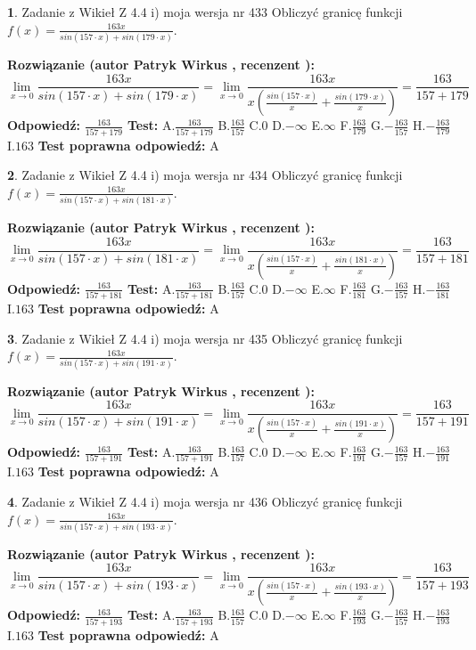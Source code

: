 \documentclass[12pt, a4paper]{article}
\theoremstyle{definition} %
\newtheorem{zad}{}
\newcommand{\zadStart}[1]{\begin{zad}#1\newline}
\newcommand{\zadStop}{\end{zad}}
\newcommand{\rozwStart}[2]{\noindent \textbf{Rozwiązanie (autor #1 , recenzent #2): }\newline}
\newcommand{\rozwStop}{\newline}
\newcommand{\odpStart}{\noindent \textbf{Odpowiedź:}\newline}
\newcommand{\odpStop}{\newline}
\newcommand{\testStart}{\noindent \textbf{Test:}\newline}
\newcommand{\testStop}{\newline}
\newcommand{\kluczStart}{\noindent \textbf{Test poprawna odpowiedź:}\newline}
\newcommand{\kluczStop}{\newline}
\begin{document}
\zadStart{Zadanie z Wikieł Z 4.4 i) moja wersja nr 433}
Obliczyć granicę funkcji $f(x)=\frac{163x}{sin(157\cdot x) +sin(179\cdot x)}$.
\zadStop
\rozwStart{Patryk Wirkus}{}
$$\lim\limits_{x\to 0}\frac{163x}{sin(157\cdot x) +sin(179\cdot x)}=\lim\limits_{x\to 0}\frac{163x}{x(\frac{sin(157\cdot x)}{x}+\frac{sin(179\cdot x)}{x})}=\frac{163}{157+179}$$
\rozwStop
\odpStart
$\frac{163}{157+179}$
\odpStop
\testStart
A.$\frac{163}{157+179}$
B.$\frac{163}{157}$
C.$0$
D.$-\infty$
E.$\infty$
F.$\frac{163}{179}$
G.$-\frac{163}{157}$
H.$-\frac{163}{179}$
I.$163$
\testStop
\kluczStart
A
\kluczStop



\zadStart{Zadanie z Wikieł Z 4.4 i) moja wersja nr 434}
Obliczyć granicę funkcji $f(x)=\frac{163x}{sin(157\cdot x) +sin(181\cdot x)}$.
\zadStop
\rozwStart{Patryk Wirkus}{}
$$\lim\limits_{x\to 0}\frac{163x}{sin(157\cdot x) +sin(181\cdot x)}=\lim\limits_{x\to 0}\frac{163x}{x(\frac{sin(157\cdot x)}{x}+\frac{sin(181\cdot x)}{x})}=\frac{163}{157+181}$$
\rozwStop
\odpStart
$\frac{163}{157+181}$
\odpStop
\testStart
A.$\frac{163}{157+181}$
B.$\frac{163}{157}$
C.$0$
D.$-\infty$
E.$\infty$
F.$\frac{163}{181}$
G.$-\frac{163}{157}$
H.$-\frac{163}{181}$
I.$163$
\testStop
\kluczStart
A
\kluczStop



\zadStart{Zadanie z Wikieł Z 4.4 i) moja wersja nr 435}
Obliczyć granicę funkcji $f(x)=\frac{163x}{sin(157\cdot x) +sin(191\cdot x)}$.
\zadStop
\rozwStart{Patryk Wirkus}{}
$$\lim\limits_{x\to 0}\frac{163x}{sin(157\cdot x) +sin(191\cdot x)}=\lim\limits_{x\to 0}\frac{163x}{x(\frac{sin(157\cdot x)}{x}+\frac{sin(191\cdot x)}{x})}=\frac{163}{157+191}$$
\rozwStop
\odpStart
$\frac{163}{157+191}$
\odpStop
\testStart
A.$\frac{163}{157+191}$
B.$\frac{163}{157}$
C.$0$
D.$-\infty$
E.$\infty$
F.$\frac{163}{191}$
G.$-\frac{163}{157}$
H.$-\frac{163}{191}$
I.$163$
\testStop
\kluczStart
A
\kluczStop



\zadStart{Zadanie z Wikieł Z 4.4 i) moja wersja nr 436}
Obliczyć granicę funkcji $f(x)=\frac{163x}{sin(157\cdot x) +sin(193\cdot x)}$.
\zadStop
\rozwStart{Patryk Wirkus}{}
$$\lim\limits_{x\to 0}\frac{163x}{sin(157\cdot x) +sin(193\cdot x)}=\lim\limits_{x\to 0}\frac{163x}{x(\frac{sin(157\cdot x)}{x}+\frac{sin(193\cdot x)}{x})}=\frac{163}{157+193}$$
\rozwStop
\odpStart
$\frac{163}{157+193}$
\odpStop
\testStart
A.$\frac{163}{157+193}$
B.$\frac{163}{157}$
C.$0$
D.$-\infty$
E.$\infty$
F.$\frac{163}{193}$
G.$-\frac{163}{157}$
H.$-\frac{163}{193}$
I.$163$
\testStop
\kluczStart
A
\kluczStop
\end{document}
